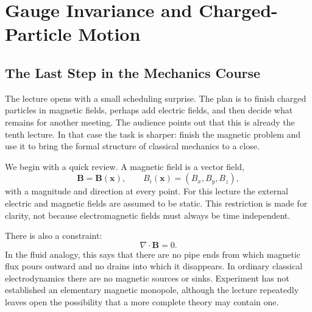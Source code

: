 \chapter{Gauge Invariance and Charged-Particle Motion}


\section{The Last Step in the Mechanics Course}

The lecture opens with a small scheduling surprise. The plan is to finish charged particles in magnetic fields, perhaps add electric fields, and then decide what remains for another meeting. The audience points out that this is already the tenth lecture. In that case the task is sharper: finish the magnetic problem and use it to bring the formal structure of classical mechanics to a close.

We begin with a quick review. A magnetic field is a vector field,
\begin{equation}
  \mathbf B=\mathbf B(\mathbf x),
  \qquad
  B_i(\mathbf x)=(B_x,B_y,B_z),
\end{equation}
with a magnitude and direction at every point. For this lecture the external electric and magnetic fields are assumed to be static. This restriction is made for clarity, not because electromagnetic fields must always be time independent.

There is also a constraint:
\begin{equation}
  \nabla\cdot\mathbf B=0.
\end{equation}
In the fluid analogy, this says that there are no pipe ends from which magnetic flux pours outward and no drains into which it disappears. In ordinary classical electrodynamics there are no magnetic sources or sinks. Experiment has not established an elementary magnetic monopole, although the lecture repeatedly leaves open the possibility that a more complete theory may contain one.

